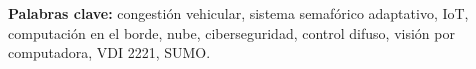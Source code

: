 \documentclass[12pt,a4paper,oneside]{report}
\numberwithin{figure}{chapter}
\numberwithin{table}{chapter}
\numberwithin{equation}{chapter}
\renewcommand{\contentsname}{ÍNDICE DE CONTENIDO}%
\DeclareRobustCommand{\%}{\ifmmode\text{\char37\relax}\else\char37\relax\fi}%
\begin{document}
\vspace{0.4cm}
\noindent\textbf{Palabras clave:} congestión vehicular, sistema semafórico adaptativo, IoT, computación en
el borde, nube, ciberseguridad, control difuso, visión por computadora, VDI 2221, SUMO.

\cleardoublepage
{}
\renewcommand{\contentsname}{ÍNDICE DE CONTENIDO}
\tableofcontents

\cleardoublepage
{}
{}
\listoftables

\cleardoublepage
{}
{}
\listoffigures

\cleardoublepage
{}











\end{document}
